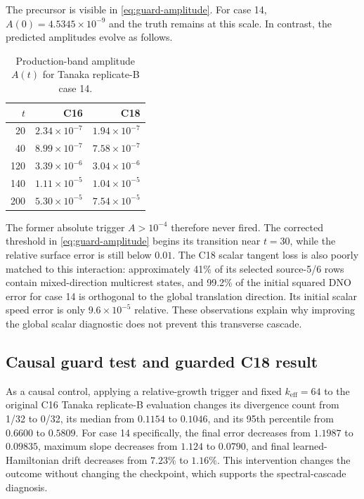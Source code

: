 The precursor is visible in \eqref{eq:guard-amplitude}. For case 14,
$A(0)=4.5345\times10^{-9}$ and the truth remains at this scale. In contrast,
the predicted amplitudes evolve as follows.

\begin{table}[t]
  \centering
  \caption{Production-band amplitude $A(t)$ for Tanaka replicate-B case 14.}
  \label{tab:case14-band-growth}
  \begin{tabular}{rrr}
    \toprule
    $t$ & C16 & C18\\
    \midrule
     20 & $2.34\times10^{-7}$ & $1.94\times10^{-7}$\\
     40 & $8.99\times10^{-7}$ & $7.58\times10^{-7}$\\
    120 & $3.39\times10^{-6}$ & $3.04\times10^{-6}$\\
    140 & $1.11\times10^{-5}$ & $1.04\times10^{-5}$\\
    200 & $5.30\times10^{-5}$ & $7.54\times10^{-5}$\\
    \bottomrule
  \end{tabular}
\end{table}

The former absolute trigger $A>10^{-4}$ therefore never fired. The corrected
threshold in \eqref{eq:guard-amplitude} begins its transition near $t=30$,
while the relative surface error is still below $0.01$. The C18 scalar tangent
loss is also poorly matched to this interaction: approximately 41\% of its
selected source-5/6 rows contain mixed-direction multicrest states, and 99.2\%
of the initial squared DNO error for case 14 is orthogonal to the global
translation direction. Its initial scalar speed error is only
$9.6\times10^{-5}$ relative. These observations explain why improving the
global scalar diagnostic does not prevent this transverse cascade.

\subsection{Causal guard test and guarded C18 result}
\label{sec:guard-results}

As a causal control, applying a relative-growth trigger and fixed
$k_{\mathrm{eff}}=64$ to the original C16 Tanaka replicate-B evaluation changes its
divergence count from 1/32 to 0/32, its median from $0.1154$ to $0.1046$, and
its 95th percentile from $0.6600$ to $0.5809$. For case 14 specifically, the
final error decreases from $1.1987$ to $0.09835$, maximum slope decreases from
$1.124$ to $0.0790$, and final learned-Hamiltonian drift decreases from
$7.23\%$ to $1.16\%$. This intervention changes the outcome without changing
the checkpoint, which supports the spectral-cascade diagnosis.

